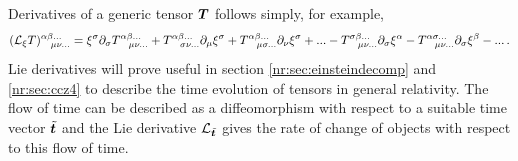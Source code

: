 Derivatives of a generic tensor $\boldsymbol{T}$ follows simply, for example,
\begin{equation}(\mathcal{L}_\xi T )^{\alpha\beta ...}_{\,\,\,\,\,\,\mu\nu...} = \xi^\sigma \partial_\sigma T^{\alpha\beta ...}_{\,\,\,\,\,\,\mu\nu...} + T^{\alpha\beta ...}_{\,\,\,\,\,\,\sigma\nu...} \partial_\mu \xi^\sigma + T^{\alpha\beta ...}_{\,\,\,\,\,\,\mu\sigma...} \partial_\nu \xi^\sigma + ... - T^{\sigma\beta ...}_{\,\,\,\,\,\,\mu\nu...}\partial_\sigma \xi^\alpha - T^{\alpha\sigma ...}_{\,\,\,\,\,\,\mu\nu...}\partial_\sigma \xi^\beta - ...\,.
\end{equation}
Lie derivatives will prove useful in section \ref{nr:sec:einsteindecomp} and \ref{nr:sec:ccz4} to describe the time evolution of tensors in general relativity. The flow of time can be described as a diffeomorphism with respect to a suitable time vector $\tilde{\boldsymbol{t}}$ and the Lie derivative $\mathcal{L}_{\tilde{\boldsymbol{t}}}$ gives the rate of change of objects with respect to this flow of time.





